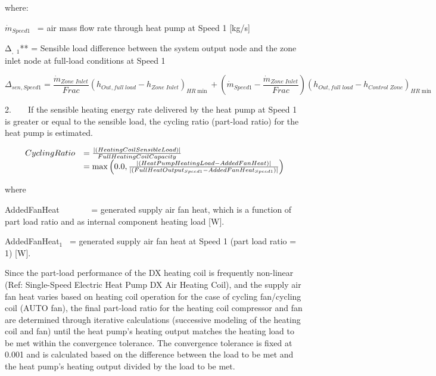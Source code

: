 where:

\emph{\({{{\dot m}_{Speed1}}}\)}~ = air mass flow rate through heat pump at Speed 1 {[}kg/s{]}

Δ\(_{,}\) \(_{1}\)** = Sensible load difference between the system output node and the zone inlet node at full-load conditions at Speed 1

\begin{equation}
{\Delta_{sen,Speed1}} = \frac{{{{\dot m}_{Zone\;Inlet}}}}{{Frac}}{\left( {{h_{Out,full\;load}} - {h_{Zone\;Inlet}}} \right)_{HR\min }} + \left( {{{\dot m}_{Speed1}} - \frac{{{{\dot m}_{Zone\;Inlet}}}}{{Frac}}} \right){\left( {{h_{Out,full\;load}} - {h_{Control\;Zone}}} \right)_{HR\min }}
\end{equation}

2.~~~~If the sensible heating energy rate delivered by the heat pump at Speed 1 is greater or equal to the sensible load, the cycling ratio (part-load ratio) for the heat pump is estimated.

\begin{equation}
  \begin{array}{rl}
    CyclingRatio &= \frac{\left|\PB{HeatingCoilSensibleLoad}\right|}{FullHeatingCoilCapacity} \\
                 &= \max \PB{0.0, \frac{\left|\PB{HeatPumpHeatingLoad-AddedFanHeat}\right|}{\left|\PB{FullHeatOutput_{Speed1}-AddedFanHeat_{Speed1}}\right|} }
  \end{array}
\end{equation}

where

AddedFanHeat~~~~~~~ = generated supply air fan heat, which is a function of part load ratio and as internal component heating load {[}W{]}.

AddedFanHeat\(_{1}\)~ = generated supply air fan heat at Speed 1 (part load ratio = 1) {[}W{]}.

Since the part-load performance of the DX heating coil is frequently non-linear (Ref: Single-Speed Electric Heat Pump DX Air Heating Coil), and the supply air fan heat varies based on heating coil operation for the case of cycling fan/cycling coil (AUTO fan), the final part-load ratio for the heating coil compressor and fan are determined through iterative calculations (successive modeling of the heating coil and fan) until the heat pump's heating output matches the heating load to be met within the convergence tolerance. The convergence tolerance is fixed at 0.001 and is calculated based on the difference between the load to be met and the heat pump's heating output divided by the load to be met.

